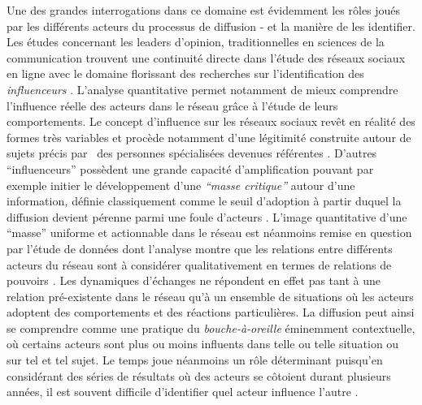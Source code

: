 Une des grandes interrogations dans ce domaine est évidemment les r\^oles joués par les différents acteurs du processus de diffusion - et la manière de les identifier. Les études concernant les leaders d{\textquoteright}opinion, traditionnelles en sciences de la communication \citep{Katz1955} trouvent une continuité directe dans l{\textquoteright}étude des réseaux sociaux en ligne avec le domaine florissant des recherches sur l{\textquoteright}identification des \textit{influenceurs} \citep{Bakshy2011, Leavitt2009}. L{\textquoteright}analyse quantitative permet notamment de mieux comprendre l{\textquoteright}influence réelle des acteurs dans le réseau gr\^ace à l{\textquoteright}étude de leurs comportements. Le concept d{\textquoteright}influence sur les réseaux sociaux rev\^et en réalité des formes très variables et procède notamment d{\textquoteright}une légitimité construite autour de sujets précis par \ des personnes spécialisées devenues référentes \citep{Cha2010}. D{\textquoteright}autres {\textquotedblleft}influenceurs{\textquotedblright} possèdent une grande capacité d{\textquoteright}amplification pouvant par exemple initier le développement d{\textquoteright}une \textit{{\textquotedblleft}masse critique{\textquotedblright} }autour d{\textquoteright}une information\textit{, }définie classiquement comme le seuil d{\textquoteright}adoption à partir duquel la diffusion devient pérenne parmi une foule d{\textquoteright}acteurs \citep{Oliver2001}. L{\textquoteright}image quantitative d{\textquoteright}une {\textquotedblleft}masse{\textquotedblright} uniforme et actionnable dans le réseau est néanmoins remise en question par l{\textquoteright}étude de données dont l{\textquoteright}analyse montre que les relations entre différents acteurs du réseau sont à considérer qualitativement en termes de relations de pouvoirs \citep{Steyer2006}\textit{. }Les dynamiques d{\textquoteright}échanges ne répondent en effet pas tant à une relation pré-existente dans le réseau qu{\textquoteright}à un ensemble de situations o\`u les acteurs adoptent des comportements et des réactions particulières. La diffusion peut ainsi se comprendre comme une pratique du \textit{bouche-à-oreille} éminemment contextuelle, o\`u certains acteurs sont plus ou moins influents dans telle ou telle situation ou sur tel et tel sujet. Le temps joue néanmoins un r\^ole déterminant puisqu{\textquoteright}en considérant des séries de résultats o\`u des acteurs se c\^otoient durant plusieurs années, il est souvent difficile d{\textquoteright}identifier quel acteur influence l{\textquoteright}autre \citep{Aral2009}. 

